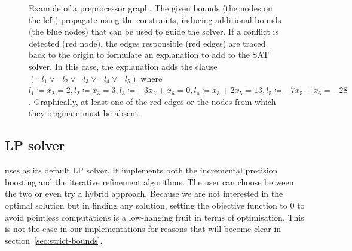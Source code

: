 \documentclass[runningheads]{llncs}
\begin{document}
\begin{figure}[h]
    \caption{Example of a preprocessor graph. The given bounds (the nodes on the left) propagate using the constraints, inducing additional bounds (the blue nodes) that can be used to guide the solver.
        If a conflict is detected (red node), the edges responsible (red edges) are traced back to the origin to formulate an explanation to add to the SAT solver.
        In this case, the explanation adds the clause $(\neg l_1 \lor \neg l_2 \lor \neg l_3 \lor \neg l_4 \lor \neg l_5)$ where $l_1 \coloneqq x_2 = 2, l_2 \coloneqq x_3 = 3, l_3 \coloneqq -3x_2 + x_6 = 0, l_4 \coloneqq x_3 + 2x_5 = 13, l_5 \coloneqq -7x_5 + x_6 = -28$.
        Graphically, at least one of the red edges or the nodes from which they originate must be absent.}
    \label{dg:preprocessor}
\end{figure}

\subsection{LP solver}

\dlinear uses \soplex as its default LP solver.
It implements both the incremental precision boosting and the iterative refinement algorithms.
The user can choose between the two or even try a hybrid approach.
Because we are not interested in the optimal solution but in finding any solution, setting the objective function to $0$ to avoid pointless computations is a low-hanging fruit in terms of optimisation.
This is not the case in our implementations for reasons that will become clear in section~\ref{sec:strict-bounds}.
\end{document}
